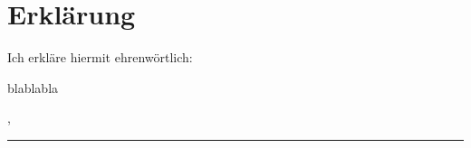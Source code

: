\thispagestyle{empty}

\section*{Erklärung}
\vspace*{2em}

Ich erkläre hiermit ehrenwörtlich:

blablabla

\vspace{3em}

\abgabeort, \datumAbgabe
\vspace{4em}

\rule{6cm}{0.4pt}\\
\autor